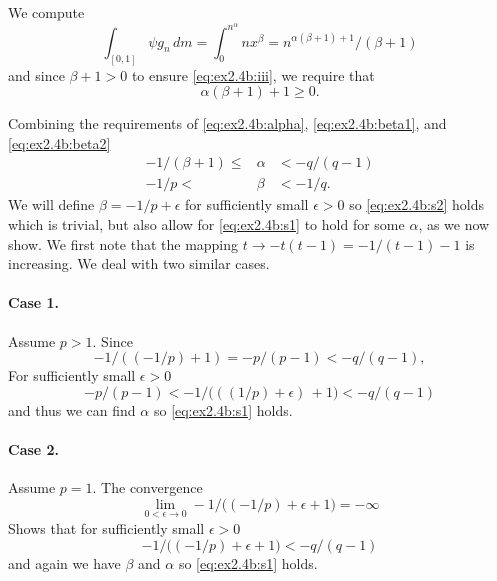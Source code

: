 \begin{enumerate}
\begin{itemize}
  We compute
  \begin{equation*}
   \int_{[0,1]} \psi g_n\,dm 
   = \int_0^{n^\alpha} n x^\beta = n^{\alpha(\beta+1) + 1} / (\beta+1)
  \end{equation*}
   and since \(\beta+1 > 0\)
   to ensure \eqref{eq:ex2.4b:iii},  we require that 
   \begin{equation}  \label{eq:ex2.4b:beta2}
     \alpha(\beta+1) + 1 \geq 0.
   \end{equation}

   Combining the requirements of 
   \eqref{eq:ex2.4b:alpha}, 
   \eqref{eq:ex2.4b:beta1}, and 
   \eqref{eq:ex2.4b:beta2}
   \begin{eqnarray} 
     -1/(\beta + 1) \leq &\alpha& < -q/(q-1) \label{eq:ex2.4b:s1} \\
           -1/p     <    &\beta& < -1/q .    \label{eq:ex2.4b:s2}
   \end{eqnarray}
   We will define \(\beta = -1/p + \epsilon\) 
   for sufficiently small \(\epsilon > 0\) 
   so \eqref{eq:ex2.4b:s2} holds which is trivial,
   but also allow for \eqref{eq:ex2.4b:s1} to hold for some \(\alpha\),
   as we now show.
   We first note that the mapping
   \(t \to -t(t-1) = -1/(t-1) -1\) is increasing.
   We deal with two similar cases.
   \paragraph{Case 1.} Assume \(p>1\). 
   Since
   \begin{equation*}
     -1/((-1/p) + 1) = -p/(p-1) < -q/(q-1),
   \end{equation*}
   For sufficiently small \(\epsilon>0\) 
   \begin{equation*}
     -p/(p-1) <  -1\big/\bigl(((1/p)+\epsilon)\, + 1\bigr) < -q/(q-1)
   \end{equation*}
   and thus we can find \(\alpha\) so \eqref{eq:ex2.4b:s1} holds.
   \paragraph{Case 2.} Assume \(p=1\). The convergence
   \begin{equation*}
   \lim_{0<\epsilon\to 0} -1\big/\bigl((-1/p)+\epsilon + 1\bigr) = -\infty
   \end{equation*}
   Shows that for sufficiently small \(\epsilon > 0\)
   \begin{equation*}
      -1\big/\bigl((-1/p)+\epsilon + 1\bigr) < -q/(q-1)
   \end{equation*}
   and again we have \(\beta\) and \(\alpha\) so \eqref{eq:ex2.4b:s1} holds.


\end{itemize}
\end{enumerate}
